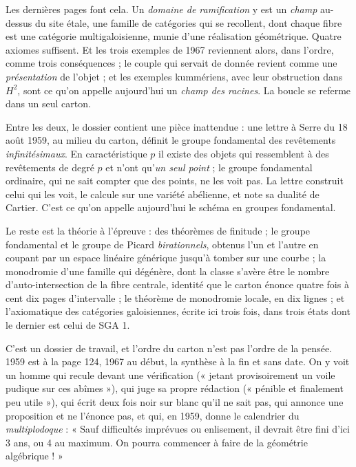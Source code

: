 \documentclass[11pt,a4paper]{article}
\begin{document}
\begin{resume}
Les dernières pages font cela. Un \emph{domaine de ramification}
y est un \emph{champ} au-dessus du site étale, une
famille de catégories qui se recollent, dont chaque fibre est une catégorie
multigaloisienne, munie d'une réalisation géométrique. Quatre axiomes suffisent.
Et les trois exemples de 1967 reviennent alors, dans l'ordre, comme trois
conséquences ; le couple qui servait de donnée revient comme une
\emph{présentation} de l'objet ; et les exemples kummériens, avec leur
obstruction dans $H^2$, sont ce qu'on appelle aujourd'hui un \emph{champ des
racines}. La boucle se referme dans un seul carton.

Entre les deux, le dossier contient une pièce inattendue : une lettre à Serre du 18 août 1959, au
milieu du carton, définit le groupe fondamental des revêtements
\emph{infinitésimaux}. En caractéristique $p$ il existe des objets qui
ressemblent à des revêtements de degré $p$ et n'ont qu'\emph{un seul point} ;
le groupe fondamental ordinaire, qui ne sait compter que des points, ne les
voit pas. La lettre construit celui qui les voit, le calcule sur une variété
abélienne, et note sa dualité de Cartier. C'est ce qu'on appelle aujourd'hui le
schéma en groupes fondamental.

Le reste est la théorie à l'épreuve : des théorèmes de finitude ; le groupe
fondamental et le groupe de Picard \emph{birationnels}, obtenus l'un et l'autre
en coupant par un espace linéaire générique jusqu'à tomber sur une courbe ; la
monodromie d'une famille qui dégénère, dont la classe s'avère être le nombre
d'auto-intersection de la fibre centrale, identité que le carton énonce
quatre fois à cent dix pages d'intervalle ; le théorème de monodromie locale,
en dix lignes ; et l'axiomatique des catégories galoisiennes, écrite ici trois
fois, dans trois états dont le dernier est celui de SGA 1.

C'est un dossier de travail, et l'ordre du carton n'est
pas l'ordre de la pensée. 1959 est à la page 124, 1967 au début, la synthèse à
la fin et sans date. On y voit un homme qui recule devant une vérification
(« jetant provisoirement un voile pudique sur ces abîmes »), qui juge sa propre
rédaction (« pénible et finalement peu utile »), qui écrit deux fois noir sur
blanc qu'il ne sait pas, qui annonce une proposition et ne l'énonce pas, et
qui, en 1959, donne le calendrier du \emph{multiplodoque} : « Sauf difficultés
imprévues ou enlisement, il devrait être fini d'ici 3 ans, ou 4 au maximum. On
pourra commencer à faire de la géométrie algébrique ! »


\end{resume}
\end{document}
